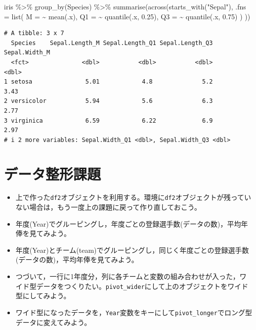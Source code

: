 \documentclass[
  a4paper,
]{ltjsbook}
\newenvironment{Shaded}{\begin{snugshade}}{\end{snugshade}}
\newcommand{\AttributeTok}[1]{\textcolor[rgb]{0.40,0.45,0.13}{#1}}
\newcommand{\FloatTok}[1]{\textcolor[rgb]{0.68,0.00,0.00}{#1}}
\newcommand{\FunctionTok}[1]{\textcolor[rgb]{0.28,0.35,0.67}{#1}}
\newcommand{\NormalTok}[1]{\textcolor[rgb]{0.00,0.23,0.31}{#1}}
\newcommand{\SpecialCharTok}[1]{\textcolor[rgb]{0.37,0.37,0.37}{#1}}
\newcommand{\StringTok}[1]{\textcolor[rgb]{0.13,0.47,0.30}{#1}}
\providecommand{\tightlist}{%
  \setlength{\itemsep}{0pt}\setlength{\parskip}{0pt}}\usepackage{longtable,booktabs,array}
\begin{document}
\begin{Shaded}
\begin{Highlighting}[]
\NormalTok{iris }\SpecialCharTok{\%\textgreater{}\%}
  \FunctionTok{group\_by}\NormalTok{(Species) }\SpecialCharTok{\%\textgreater{}\%}
  \FunctionTok{summarise}\NormalTok{(}\FunctionTok{across}\NormalTok{(}\FunctionTok{starts\_with}\NormalTok{(}\StringTok{"Sepal"}\NormalTok{),}
    \AttributeTok{.fns =} \FunctionTok{list}\NormalTok{(}
      \AttributeTok{M =} \SpecialCharTok{\textasciitilde{}} \FunctionTok{mean}\NormalTok{(.x),}
      \AttributeTok{Q1 =} \SpecialCharTok{\textasciitilde{}} \FunctionTok{quantile}\NormalTok{(.x, }\FloatTok{0.25}\NormalTok{),}
      \AttributeTok{Q3 =} \SpecialCharTok{\textasciitilde{}} \FunctionTok{quantile}\NormalTok{(.x, }\FloatTok{0.75}\NormalTok{)}
\NormalTok{    )}
\NormalTok{  ))}
\end{Highlighting}
\end{Shaded}

\begin{verbatim}
# A tibble: 3 x 7
  Species    Sepal.Length_M Sepal.Length_Q1 Sepal.Length_Q3 Sepal.Width_M
  <fct>               <dbl>           <dbl>           <dbl>         <dbl>
1 setosa               5.01            4.8              5.2          3.43
2 versicolor           5.94            5.6              6.3          2.77
3 virginica            6.59            6.22             6.9          2.97
# i 2 more variables: Sepal.Width_Q1 <dbl>, Sepal.Width_Q3 <dbl>
\end{verbatim}

\section{データ整形課題}\label{ux30c7ux30fcux30bfux6574ux5f62ux8ab2ux984c}

\begin{itemize}
\tightlist
\item
  上で作った\texttt{df2}オブジェクトを利用する。環境に\texttt{df2}オブジェクトが残っていない場合は，もう一度上の課題に戻って作り直しておこう。
\item
  年度(Year)でグルーピングし，年度ごとの登録選手数(データの数)，平均年俸を見てみよう。
\item
  年度(Year)とチーム(team)でグルーピングし，同じく年度ごとの登録選手数(データの数)，平均年俸を見てみよう。
\item
  つづいて，一行に1年度分，列に各チームと変数の組み合わせが入った，ワイド型データをつくりたい。\texttt{pivot\_wider}にして上のオブジェクトをワイド型にしてみよう。
\item
  ワイド型になったデータを，\texttt{Year}変数をキーにして\texttt{pivot\_longer}でロング型データに変えてみよう。
\end{itemize}
\end{document}
